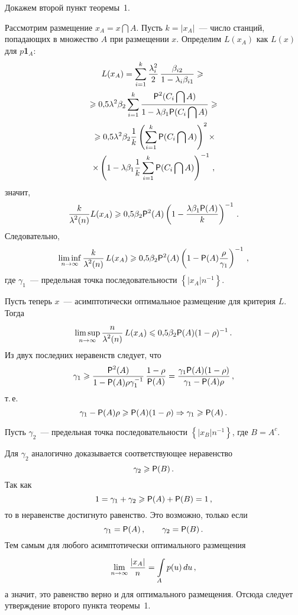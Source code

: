 \begin{multicols}{2}
\smallskip
Докажем второй пункт теоремы~1.

Рассмотрим размещение $x_A=x\bigcap A$. Пусть $k=\vert x_A\vert $~---
число станций, попадающих в множество $A$ при размещении $x$.
Определим $L(x_A)$ как $L(x)$ для $p$\textbf{1}$_A$:
\begin{multline*}
L(x_A)=\sum\limits_{i=1}^{k}\displaystyle\frac{\displaystyle \lambda_i^2\mathstrut}{\displaystyle 2\mathstrut}\, \displaystyle\frac{\displaystyle \beta_{i2}\mathstrut}{\displaystyle 1-\lambda_i \beta_{i1}\mathstrut}\geqslant{}\\
{}\geqslant  0{,}5\lambda^2\beta_2\sum\limits_{i=1}^{k}
\displaystyle\frac{\displaystyle {\sf P}^2(C_i\bigcap A)\mathstrut}{\displaystyle 1-\lambda \beta_1 {\sf P}(C_i\bigcap
A)\mathstrut}\geqslant {}\\
{} \geqslant 0{,}5\lambda^2\beta_2
\displaystyle\frac{\displaystyle 1\mathstrut}{\displaystyle k\mathstrut}\left(\sum\limits_{i=1}^{k}{\sf P}(C_i\bigcap A)\right)^2\times\\
\times 
\left(1-\lambda \beta_1 \displaystyle\frac{\displaystyle 1\mathstrut}{\displaystyle k\mathstrut}\sum\limits_{i=1}^{k}{\sf P}(C_i\bigcap
A)\right)^{-1}\,,
\end{multline*}
значит,
$$
\displaystyle\frac{\displaystyle k\mathstrut}{\displaystyle \lambda^2(n)\mathstrut}L(x_A)\geqslant
0{,}5\beta_2{\sf P}^2(A)\left( 1-\displaystyle\frac{\displaystyle \lambda \beta_1
{\sf P}(A)\mathstrut}{\displaystyle k\mathstrut}\right)^{-1}\,.
$$
Следовательно,
\begin{equation*}
\liminf\limits_{n \to
\infty}\displaystyle\frac{\displaystyle k\mathstrut}{\displaystyle \lambda^2(n)\mathstrut}\,L(x_A)\geqslant
0{,}5\beta_2{\sf P}^2(A)\left(1-
{\sf P}(A)\displaystyle\frac{\displaystyle \rho\mathstrut}{\displaystyle \gamma_1\mathstrut}\right)^{-1}\,,
\end{equation*}
где $\gamma_1$~---
предельная точка последовательности $\left\{\vert x_A\vert n^{-1}
\right\}$.

\smallskip
Пусть теперь $x$~--- асимптотически оптимальное размещение для
критерия $L$. Тогда
$$ 
\limsup\limits_{n \to
\infty}\displaystyle\frac{\displaystyle n\mathstrut}{\displaystyle \lambda^2(n)\mathstrut}\,L(x_A) \leqslant
0{,}5\beta_2{\sf P}(A)(1-\rho)^{-1}\,.
$$
Из двух последних неравенств
следует, что
\begin{equation*}
 \gamma_1\geqslant \displaystyle\frac{\displaystyle {\sf P}^2(A)\mathstrut}{\displaystyle 1-
{\sf P}(A)\rho\gamma_1^{-1} \mathstrut}\, \displaystyle\frac{\displaystyle 1-\rho\mathstrut}{\displaystyle {\sf P}(A)\mathstrut}=
\displaystyle\frac{\displaystyle \gamma_1
{\sf P}(A)(1-\rho)\mathstrut}{\displaystyle \gamma_1-{\sf P}(A)\rho\mathstrut}\,,
\end{equation*}
т.\,е.
$$
\gamma_1-{\sf P}(A)\rho \geqslant {\sf P}(A)(1-\rho)  \Rightarrow
\gamma_1 \geqslant {\sf P}(A)\,.
$$

Пусть $\gamma_2$~--- предельная точка последовательности
$\left\{\vert x_B\vert n^{-1} \right\}$, где $B=A^c$.

Для $\gamma_2$ аналогично доказывается соответст\-ву\-ющее неравенство
$$
\gamma_2 \geqslant {\sf P}(B)\,.
$$
Так как
$$
1=\gamma_1+\gamma_2\geqslant {\sf P}(A)+{\sf P}(B)=1\,,
$$
то в неравенстве достигнуто равенство. Это возможно, только если
$$
\gamma_1={\sf P}(A)\,, \qquad \gamma_2={\sf P}(B)\,.
$$
Тем самым для
любого асимптотически оптимального размещения
$$
\lim\limits_{n\rightarrow\infty}\displaystyle\frac{\displaystyle \vert x_A\vert \mathstrut}{\displaystyle n\mathstrut}=\int\limits_{A}^{}p(u)\,du\,,
$$
а значит, это равенство верно и для оптимального размещения.
Отсюда следует утверждение второго пункта теоремы~1.


\end{multicols}

